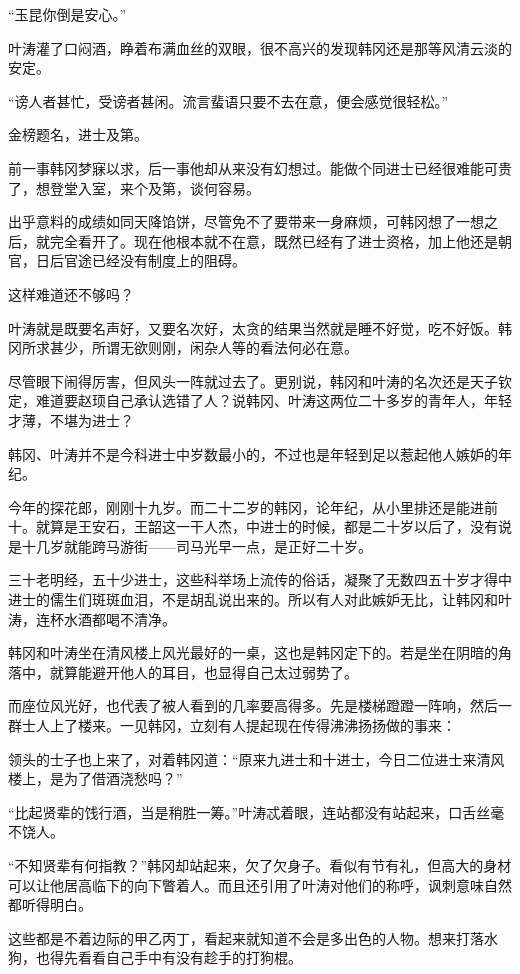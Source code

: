 “玉昆你倒是安心。”

叶涛灌了口闷酒，睁着布满血丝的双眼，很不高兴的发现韩冈还是那等风清云淡的安定。

“谤人者甚忙，受谤者甚闲。流言蜚语只要不去在意，便会感觉很轻松。”

金榜题名，进士及第。

前一事韩冈梦寐以求，后一事他却从来没有幻想过。能做个同进士已经很难能可贵了，想登堂入室，来个及第，谈何容易。

出乎意料的成绩如同天降馅饼，尽管免不了要带来一身麻烦，可韩冈想了一想之后，就完全看开了。现在他根本就不在意，既然已经有了进士资格，加上他还是朝官，日后官途已经没有制度上的阻碍。

这样难道还不够吗？

叶涛就是既要名声好，又要名次好，太贪的结果当然就是睡不好觉，吃不好饭。韩冈所求甚少，所谓无欲则刚，闲杂人等的看法何必在意。

尽管眼下闹得厉害，但风头一阵就过去了。更别说，韩冈和叶涛的名次还是天子钦定，难道要赵顼自己承认选错了人？说韩冈、叶涛这两位二十多岁的青年人，年轻才薄，不堪为进士？

韩冈、叶涛并不是今科进士中岁数最小的，不过也是年轻到足以惹起他人嫉妒的年纪。

今年的探花郎，刚刚十九岁。而二十二岁的韩冈，论年纪，从小里排还是能进前十。就算是王安石，王韶这一干人杰，中进士的时候，都是二十岁以后了，没有说是十几岁就能跨马游街——司马光早一点，是正好二十岁。

三十老明经，五十少进士，这些科举场上流传的俗话，凝聚了无数四五十岁才得中进士的儒生们斑斑血泪，不是胡乱说出来的。所以有人对此嫉妒无比，让韩冈和叶涛，连杯水酒都喝不清净。

韩冈和叶涛坐在清风楼上风光最好的一桌，这也是韩冈定下的。若是坐在阴暗的角落中，就算能避开他人的耳目，也显得自己太过弱势了。

而座位风光好，也代表了被人看到的几率要高得多。先是楼梯蹬蹬一阵响，然后一群士人上了楼来。一见韩冈，立刻有人提起现在传得沸沸扬扬做的事来：

领头的士子也上来了，对着韩冈道：“原来九进士和十进士，今日二位进士来清风楼上，是为了借酒浇愁吗？”

“比起贤辈的饯行酒，当是稍胜一筹。”叶涛忒着眼，连站都没有站起来，口舌丝毫不饶人。

“不知贤辈有何指教？”韩冈却站起来，欠了欠身子。看似有节有礼，但高大的身材可以让他居高临下的向下瞥着人。而且还引用了叶涛对他们的称呼，讽刺意味自然都听得明白。

这些都是不着边际的甲乙丙丁，看起来就知道不会是多出色的人物。想来打落水狗，也得先看看自己手中有没有趁手的打狗棍。


